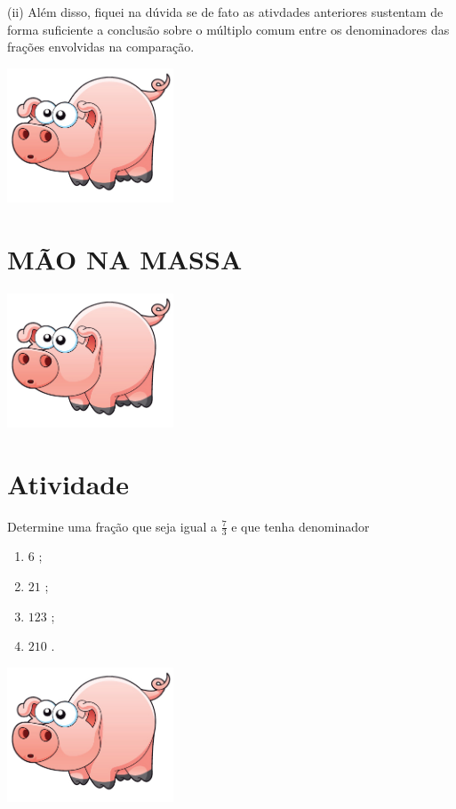 \documentclass[a4,12pt]{book}
\begin{document}
(ii) Além disso, fiquei na dúvida se de fato as ativdades anteriores sustentam de forma suficiente a conclusão sobre o múltiplo comum entre os denominadores das frações envolvidas na comparação.   




\includegraphics[width=\textwidth,height=4cm, keepaspectratio]{pig}
\section*{ MÃO NA MASSA }





\includegraphics[width=\textwidth,height=4cm, keepaspectratio]{pig}
\section{Atividade}







Determine uma fração que seja igual a $\frac{7}{3}$ e que tenha denominador

\begin{enumerate} [\quad a)] %
  \item         $6$    ;
  \item         $21$    ;
  \item         $123$    ;
  \item         $210$    .
\end{enumerate} %






\includegraphics[width=\textwidth,height=4cm, keepaspectratio]{pig}
\end{document}
